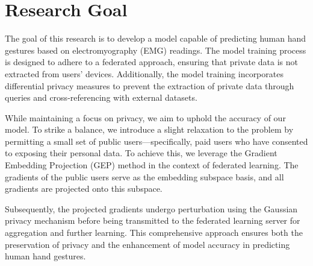 \documentclass[fourier]{_style/dissertation}
\begin{document}
\chapter{Research Goal}

The goal of this research is to develop a model capable of predicting human hand gestures based on electromyography (EMG) readings. The model training process is designed to adhere to a federated approach, ensuring that private data is not extracted from users' devices. Additionally, the model training incorporates differential privacy measures to prevent the extraction of private data through queries and cross-referencing with external datasets.

While maintaining a focus on privacy, we aim to uphold the accuracy of our model. To strike a balance, we introduce a slight relaxation to the problem by permitting a small set of public users—specifically, paid users who have consented to exposing their personal data. To achieve this, we leverage the Gradient Embedding Projection (GEP) method \cite{Yu2021DoLearning} in the context of federated learning. The gradients of the public users serve as the embedding subspace basis, and all gradients are projected onto this subspace.

Subsequently, the projected gradients undergo perturbation using the Gaussian privacy mechanism before being transmitted to the federated learning server for aggregation and further learning. This comprehensive approach ensures both the preservation of privacy and the enhancement of model accuracy in predicting human hand gestures.
\end{document}
